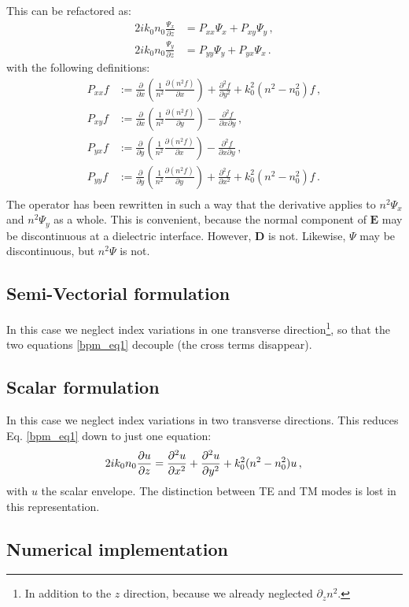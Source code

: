 \documentclass[]{article}
\begin{document}
	This can be refactored as:
	\begin{subequations}
		\begin{align}
			2i k_0 n_0 \frac{\Psi_x}{\partial z} &= P_{xx} \Psi_x+P_{xy} \Psi_y \, ,\\
			2i k_0 n_0 \frac{\Psi_y}{\partial z} &= P_{yy} \Psi_y+P_{yx} \Psi_x \, .
		\end{align}
		\label{bpm_eq1}
	\end{subequations}
	with the following definitions:
	\begin{subequations}
		\begin{align}
			P_{xx} f &:= \frac{\partial}{\partial x}\left(\frac{1}{n^2}\frac{\partial (n^2 f)}{\partial x}  \right)+\frac{\partial^2 f}{\partial y^2}+k_0^2(n^2-n_0^2)f\, , \\
			P_{xy} f &:= \frac{\partial}{\partial x}\left(\frac{1}{n^2}\frac{\partial (n^2 f)}{\partial y}  \right) - \frac{\partial^2 f}{\partial x \partial y}\, ,\\
			P_{yx} f &:= \frac{\partial}{\partial y}\left(\frac{1}{n^2}\frac{\partial (n^2 f)}{\partial x}  \right) - \frac{\partial^2 f}{\partial x \partial y}\, ,\\
			P_{yy} f &:= \frac{\partial}{\partial y}\left(\frac{1}{n^2}\frac{\partial (n^2 f)}{\partial y}  \right)+\frac{\partial^2 f}{\partial x^2}+k_0^2(n^2-n_0^2)f\, .\\
		\end{align}
	\end{subequations}
	The operator has been rewritten in such a way that the derivative applies to $n^2 \Psi_x$ and $n^2 \Psi_y$ as a whole. This is convenient, because the normal component of $\textbf{E}$ may be discontinuous at a dielectric interface. However, $\textbf{D}$ is not. Likewise, $\Psi$ may be discontinuous, but $n^2 \Psi$ is not.
	
	\subsection{Semi-Vectorial formulation}
	In this case we neglect index variations in one transverse direction\footnote{In addition to the $z$ direction, because we already neglected $\partial_z n^2$.}, so that the two equations \eqref{bpm_eq1} decouple (the cross terms disappear). 
		
	\subsection{Scalar formulation}
	In this case we neglect index variations in two transverse directions. This reduces Eq. \eqref{bpm_eq1} down to just one equation:
	\begin{equation}
		2i k_0 n_0 \frac{\partial u}{\partial z} = \frac{\partial^2u}{\partial x^2}+\frac{\partial^2u}{\partial y^2}+k_0^2(n^2-n_0^2)u \, ,\\
	\end{equation}
	with $u$ the scalar envelope. The distinction between TE and TM modes is lost in this representation.
	
	
	\subsection{Numerical implementation}
	
	
	
	
	
	
	
	
	
\end{document}
